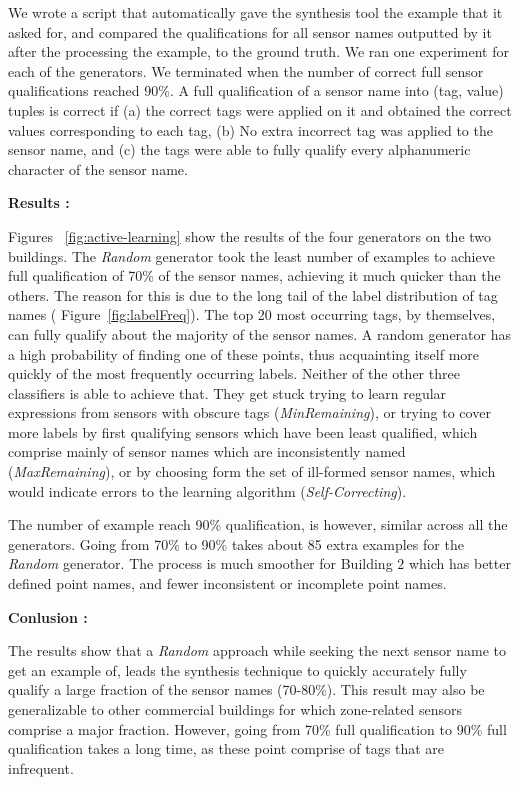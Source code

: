 We wrote a script that automatically gave the synthesis tool the example that it asked for, and compared the qualifications for all sensor names outputted by it after the processing the example,  to the ground truth. We ran one experiment for each of the generators. We terminated when the number of correct full sensor qualifications reached 90\%. A full qualification of a sensor name into (tag, value) tuples is correct if (a) the correct tags were applied on it and  obtained the correct values corresponding to each tag, (b) No extra incorrect tag was applied to the sensor name, and (c) the tags were able to fully qualify every alphanumeric character of the sensor name.


{\bf Results : }

Figures ~\ref{fig:active-learning} show the results of the four generators on the two buildings. The \emph{Random} generator took the least number of examples to achieve full qualification of 70\% of the sensor names, achieving it much quicker than the others. The reason for this is due to the long tail of the label distribution of tag names (  Figure~\ref{fig:labelFreq}). The top 20 most occurring tags, by themselves, can fully qualify about the majority of the sensor names. A random generator has a high probability of finding one of these points, thus acquainting itself more quickly of the most frequently occurring labels. Neither of the other three classifiers is able to achieve that. They get stuck trying to learn regular expressions from sensors with obscure tags (\emph{MinRemaining}), or trying to cover more labels by first qualifying sensors which have been least qualified, which comprise mainly of sensor names which are inconsistently named (\emph{MaxRemaining}), or by choosing form the set of ill-formed sensor names, which would indicate errors to the learning algorithm (\emph{Self-Correcting}).

The number of example reach 90\% qualification, is however, similar across all the generators. Going from 70\% to 90\% takes about 85 extra examples for the {\it Random} generator. The process is much smoother for Building $2$ which has better defined point names, and fewer inconsistent or incomplete point names.

{\bf Conlusion :}

The results show that a {\it Random} approach while seeking the next sensor name to get an example of, leads the synthesis technique to quickly accurately fully qualify a large fraction of the sensor names (70-80\%). This result may also be generalizable to other commercial buildings for which zone-related sensors comprise a major fraction. However, going from 70\% full qualification to 90\% full qualification takes a long time, as these point comprise of tags that are infrequent.

